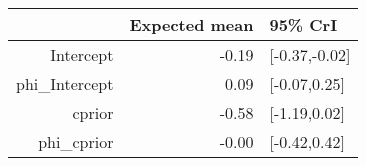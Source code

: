 \begin{tabular}{rrl}
  \hline
 & Expected mean & 95\% CrI \\ 
  \hline
Intercept & -0.19 & [-0.37,-0.02] \\ 
  phi\_Intercept & 0.09 & [-0.07,0.25] \\ 
  cprior & -0.58 & [-1.19,0.02] \\ 
  phi\_cprior & -0.00 & [-0.42,0.42] \\ 
   \hline
\end{tabular}

